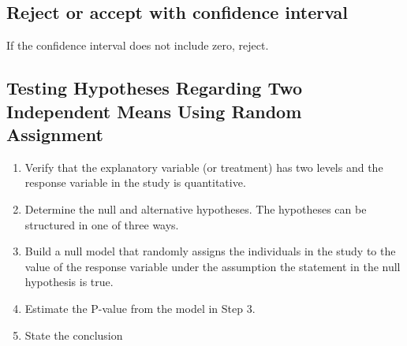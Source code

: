 \documentclass{report}
\begin{document}
    \bigbreak \noindent \bigbreak \noindent 
    \subsection*{Reject or accept with confidence interval}
    \bigbreak \noindent 
    If the confidence interval does not include zero, reject.

    \bigbreak \noindent \bigbreak \noindent 
    \subsection*{Testing Hypotheses Regarding Two Independent Means Using Random Assignment}
    \bigbreak \noindent 
    \begin{enumerate}
        \item Verify that the explanatory variable (or treatment) has two levels and the response variable in the study is quantitative.
        \item Determine the null and alternative hypotheses. The hypotheses can be structured in one of three ways.
        \item Build a null model that randomly assigns the individuals in the study to the value of the response variable under the assumption the statement in the null hypothesis is true.
        \item Estimate the P-value from the model in Step 3.
        \item State the conclusion
    \end{enumerate}

    \bigbreak \noindent \bigbreak \noindent 
\end{document}
